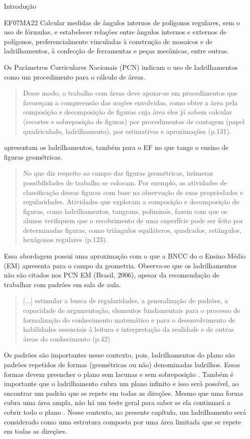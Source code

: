 \begin{apresentacao}{Introdução}
\begin{habilities}{EF07MA22} Calcular medidas de ângulos internos de polígonos regulares, sem o uso de fórmulas, e estabelecer relações entre ângulos internos e externos de polígonos, preferencialmente vinculadas à construção de mosaicos e de ladrilha{}mentos, à confecção de ferramentas e peças mecânicas, entre outras. 
\end{habilities}

Os Parâmetros Curriculares Nacionais (PCN) \citep{PCN1999} indicam o uso de ladrilhamentos como um procedimento para o cálculo de áreas.
\begin{quote}
Desse modo, o trabalho com áreas deve apoiar-se em procedimentos que favoreçam a compreensão das noções envolvidas, como obter a área pela composição e decomposição de figuras cuja área eles já sabem calcular (recortes e sobreposição de figuras) por procedimentos de contagem (papel quadriculado, ladrilhamento), por estimativas e aproximações (p.131).
\end{quote}

\citet{PCN1999} apresentam os ladrilhamentos, também para o EF no que tange o ensino de figuras geométricas.
\begin{quote}
No que diz respeito ao campo das figuras geométricas, inúmeras possibilidades de trabalho se colocam. Por exemplo, as atividades de classificação dessas figuras com base na observação de suas propriedades e regularidades. Atividades que exploram a composição e decomposição de figuras, como ladrilhamentos, tangrans, poliminós, fazem com que os alunos verifiquem que o recobrimento de uma superfície pode ser feito por determinadas figuras, como triângulos equiláteros, quadrados, retângulos, hexágonos regulares (p.123).
\end{quote}

Essa abordagem possui uma aproximação com o que a BNCC do o Ensino Médio (EM) apresenta para o campo da geometria. Observa-se que os ladrilhamentos não são citados nos PCN EM (Brasil, 2006), apesar da recomendação de trabalhar com padrões em sala de aula. 
\begin{quote}
[...] estimular a busca de regularidades, a generalização de padrões, a capacidade de argumentação, elementos fundamentais para o processo de formalização do conhecimento matemático e para o desenvolvimento de habilidades essenciais à leitura e interpretação da realidade e de outras áreas do conhecimento (p.42)
\end{quote}

Os padrões são importantes nesse contexto, pois, ladrilhamentos do plano são padrões repetidos de formas (geométricas ou não) denominadas ladrilhos. Essas formas devem preencher o plano sem lacunas e sem sobreposição \citep{billstein2015}. Também é importante que o ladrilhamento cubra  um plano infinito e isso será  possível, ao encontrar um padrão que se repete em todas as direções. Mesmo que uma forma cubra uma área ampla, não há um teste geral para saber se ela continuará a cobrir todo o plano \citep{eberle2014}. Nesse contexto, no  presente capítulo, um ladrilhamento  será considerado como uma estrutura composta por uma área limitada que se repete em todas as direções. 


\end{apresentacao}
